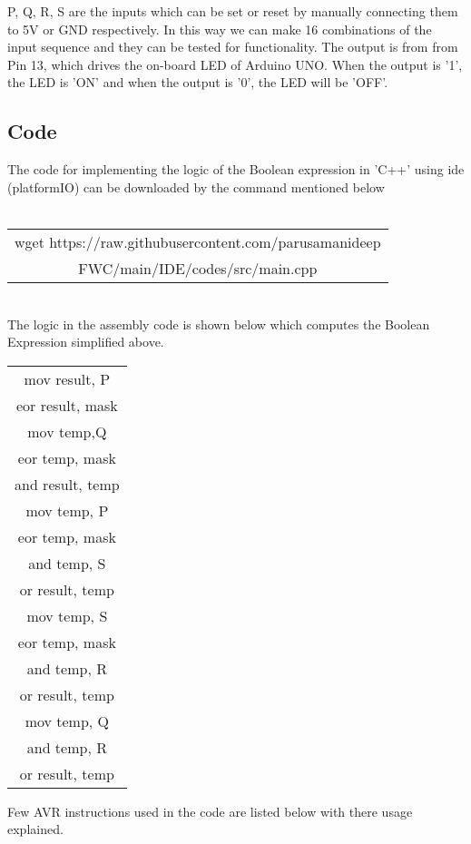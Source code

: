 \documentclass[journal,12pt,twocolumn]{IEEEtran}
\begin{document}
P, Q, R, S are the inputs which can be set or reset by manually connecting them to 5V or GND respectively. In this way we can make 16 combinations of the input sequence and they can be tested for functionality.
The output is from from Pin 13, which drives the on-board LED of Arduino UNO. When the output is '1', the LED is 'ON' and when the output is '0', the LED will be 'OFF'.\\
 
\subsection{Code}
The code for implementing the logic of the Boolean expression in 'C++' using ide (platformIO) can be downloaded by the command mentioned below \\ \\
\begin{tabular}{|c|}
    \hline
wget https://raw.githubusercontent.com/parusamanideep
\\FWC/main/IDE/codes/src/main.cpp\\
     \hline
\end{tabular}\\

\bigskip
The logic in the assembly code is shown below which computes the Boolean Expression simplified above.
\begin{tabular}{|c|}
	\hline
mov result, P	\\
eor result, mask\\
mov temp,Q	\\
eor temp, mask	\\
and result, temp\\

mov temp, P	\\
eor temp, mask	\\
and temp, S	\\
or result, temp	\\
	
mov temp, S	\\
eor temp, mask	\\
and temp, R	\\
or result, temp	\\

mov temp, Q	\\
and temp, R	\\
or result, temp	\\
\hline
\end{tabular}

Few AVR instructions used in the code are listed below with there usage explained.\\
\end{document}
